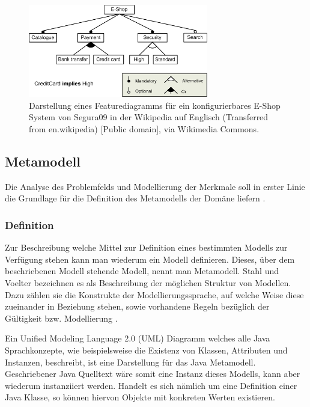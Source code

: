 \documentclass[12pt,oneside,a4paper,parskip]{scrbook}
\begin{document}
\begin{figure}[tbp]
\centering
\includegraphics[width=0.7\textwidth]{bilder/E-shopFM.jpg}
\caption{Darstellung eines Featurediagramms für ein konfigurierbares E-Shop System von Segura09 in der Wikipedia auf Englisch (Transferred from en.wikipedia) [Public domain], via Wikimedia Commons.}
\label{fig:fd}
\end{figure}

\subsection{Metamodell}

Die Analyse des Problemfelds und Modellierung der Merkmale soll in erster Linie die Grundlage für die Definition des Metamodells der Domäne liefern \cite[S. 200]{stahl2007}. 

\subsubsection{Definition}

Zur Beschreibung welche Mittel zur Definition eines bestimmten Modells zur Verfügung stehen kann man wiederum ein Modell definieren. Dieses, über dem beschriebenen Modell stehende Modell, nennt man Metamodell. Stahl und Voelter bezeichnen es als Beschreibung der möglichen Struktur von Modellen. Dazu zählen sie die Konstrukte der Modellierungssprache, auf welche Weise diese zueinander in Beziehung stehen, sowie vorhandene Regeln bezüglich der Gültigkeit bzw. Modellierung \cite[S. 59]{stahl2007}.

Ein Unified Modeling Language 2.0 (UML) Diagramm welches alle Java Sprachkonzepte, wie beispielsweise die Existenz von Klassen, Attributen und Instanzen, beschreibt, ist eine Darstellung für das Java Metamodell. Geschriebener Java Quelltext wäre somit eine Instanz dieses Modells, kann aber wiederum instanziiert werden. Handelt es sich nämlich um eine Definition einer Java Klasse, so können hiervon Objekte mit konkreten Werten existieren.
\end{document}

